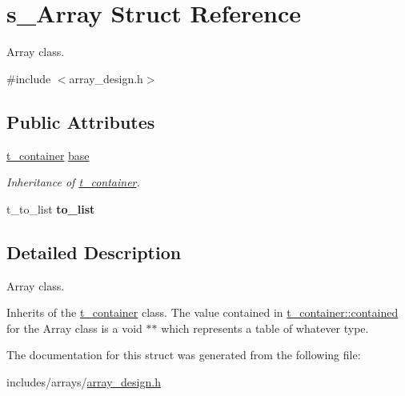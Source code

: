 \hypertarget{structs__Array}{}\section{s\+\_\+\+Array Struct Reference}
\label{structs__Array}


Array class.  




{\ttfamily \#include $<$array\+\_\+design.\+h$>$}

\subsection*{Public Attributes}
\begin{DoxyCompactItemize}
\item 
\hyperlink{container__design_8h_a2baa2855e4617ebc7ad317f13fda1cbe}{t\+\_\+container} \hyperlink{structs__Array_ade385a39ac7fc69e790d6975532de6fe}{base}\hypertarget{structs__Array_ade385a39ac7fc69e790d6975532de6fe}{}\label{structs__Array_ade385a39ac7fc69e790d6975532de6fe}

\begin{DoxyCompactList}\small\item\em Inheritance of \hyperlink{container__design_8h_a2baa2855e4617ebc7ad317f13fda1cbe}{t\+\_\+container}. \end{DoxyCompactList}\item 
t\+\_\+to\+\_\+list {\bfseries to\+\_\+list}\hypertarget{structs__Array_a4035aa4fcd8a0edc077e7013ec64de6e}{}\label{structs__Array_a4035aa4fcd8a0edc077e7013ec64de6e}

\end{DoxyCompactItemize}


\subsection{Detailed Description}
Array class. 

Inherits of the \hyperlink{container__design_8h_a2baa2855e4617ebc7ad317f13fda1cbe}{t\+\_\+container} class. The value contained in \hyperlink{structs__container_a46a37b6427c9569f29422c515529a48b}{t\+\_\+container\+::contained} for the Array class is a void $\ast$$\ast$ which represents a table of whatever type. 

The documentation for this struct was generated from the following file\+:\begin{DoxyCompactItemize}
\item 
includes/arrays/\hyperlink{array__design_8h}{array\+\_\+design.\+h}\end{DoxyCompactItemize}
